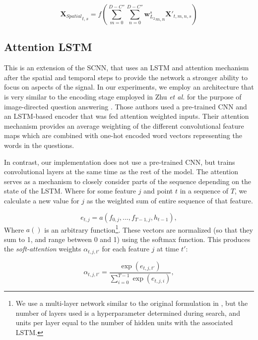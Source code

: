 \documentclass[fleqn,10pt]{wlscirep}
\begin{document}
\begin{equation} \label{eq:scnn_s2}
  {\boldsymbol{X}_{Spatial}}_{t, s} = f(\sum_{m=0}^{D-C''}\sum_{n=0}^{D-C''}{\boldsymbol{w}_{L_2}^s}_{m,n} \boldsymbol{X'}_{t, m, n, s})
\end{equation}

\subsection*{Attention LSTM}

This is an extension of the SCNN, that uses an LSTM and attention mechanism after the spatial and temporal steps to provide the network a stronger ability to focus on aspects of the signal. In our experiments, we employ an architecture that is very similar to the encoding stage employed in Zhu {\em et al.} for the purpose of image-directed question answering \cite{Zhu}. Those authors used a pre-trained CNN and an LSTM-based encoder that was fed attention weighted inputs. Their attention mechanism provides an average weighting of the different convolutional feature maps which are combined with one-hot encoded word vectors representing the words in the questions.

In contrast, our implementation does not use a pre-trained CNN, but trains convolutional layers at the same time as the rest of the model. The attention serves as a mechanism to closely consider parts of the sequence depending on the state of the LSTM. Where for some feature $j$ and point $t$ in a sequence of $T$, we calculate a new value for $j$ as the weighted sum of entire sequence of that feature.  

\begin{equation} 
  e_{t, j} = a(f_{0, j},..., f_{T-1, j}, h_{t-1}),
\end{equation}
Where $a()$ is an arbitrary function\footnote{We use a multi-layer network similar to the original formulation in \cite{XuKELVINXU}, but the number of layers used is a hyperparameter determined during search, and units per layer equal to the number of hidden units with the associated LSTM.}. These vectors are normalized (so that they sum to 1, and range between 0 and 1) using the softmax function. This produces the {\em soft-attention} weights $\alpha_{t,j,t'}$ for each feature $j$ at time $t'$:

\begin{equation} \label{eq:attn_nrg}
  \alpha_{t,j,t'} =  \frac{\exp(e_{t,j,t'})}{\sum_{i=0}^{T-1}\exp(e_{t,j,i})},
\end{equation}
\end{document}
